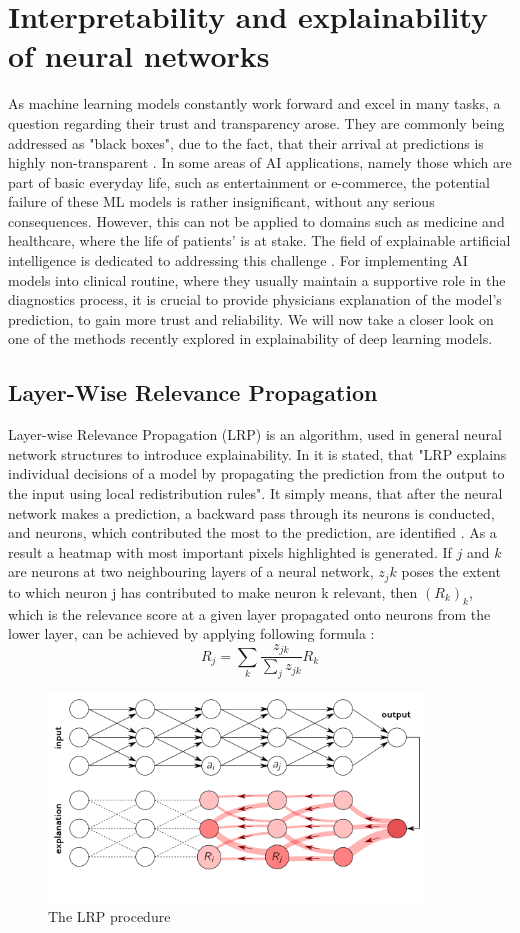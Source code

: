 \section{Interpretability and explainability of neural networks}
As machine learning models constantly work forward and excel in many tasks, a question regarding their trust and transparency arose. They are commonly being addressed as "black boxes", due to the fact, that their arrival at predictions is highly non-transparent \cite{explainDLbook}. In some areas of AI applications, namely those which are part of basic everyday life, such as entertainment or e-commerce, the potential failure of these ML models is rather insignificant, without any serious consequences. However, this can not be applied to domains such as medicine and healthcare, where the life of patients' is at stake. The field of explainable artificial intelligence is dedicated to addressing this challenge \cite{explainDLbook}. For implementing AI models into clinical routine, where they usually maintain a supportive role in the diagnostics process, it is crucial to provide physicians explanation of the model's prediction, to gain more trust and reliability. We will now take a closer look on one of the methods recently explored in explainability of deep learning models.
\subsection{Layer-Wise Relevance Propagation}
Layer-wise Relevance Propagation (LRP) is an algorithm, used in general neural network structures to introduce explainability. In \cite{explainDLbook} it is stated, that "LRP explains individual decisions of a model by propagating the prediction from the output to the input using local redistribution rules". It simply means, that after the neural network makes a prediction, a backward pass through its neurons is conducted, and neurons, which contributed the most to the prediction, are identified \cite{explainDLbook}. As a result a heatmap with most important pixels highlighted is generated.
If $j$ and $k$ are neurons at two neighbouring layers of a neural network, $z_jk$ poses the extent to which neuron j has contributed to make neuron k relevant, then $(R_k)_k$, which is the relevance score at a given layer propagated onto neurons from the lower layer, can be achieved by applying following formula \cite{explainDLbook}:
\begin{equation}
 R_j = \sum _k \frac{z_{jk}}{\sum _{j} z_{jk}} R_k   
\end{equation}

\begin{figure}[!ht]
\centering
\includegraphics[width=10cm]{assets/images/LRP}
\caption{The LRP procedure \protect\footnotemark}
\end{figure}



